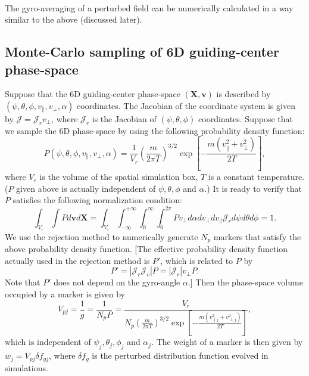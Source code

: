 \documentclass{article}
\begin{document}
\

The gyro-averaging of a perturbed field can be numerically calculated in a
way similar to the above (discussed later).

\subsection{Monte-Carlo sampling of 6D guiding-center phase-space
}\label{19-1-28-1}

Suppose that the 6D guiding-center phase-space $(\mathbf{X}, \mathbf{v})$ is
described by $(\psi, \theta, \phi, v_{\parallel}, v_{\perp}, \alpha)$
coordinates. The Jacobian of the coordinate system is given by $\mathcal{J} =
\mathcal{J}_r v_{\perp} \mathcal{}$, where $\mathcal{J}_r$ is the Jacobian of
$(\psi, \theta, \phi)$ coordinates. Suppose that we sample the 6D phase-space
by using the following probability density function:
\begin{equation}
  \label{19-1-26-1} P (\psi, \theta, \phi, v_{\parallel}, v_{\perp}, \alpha) =
  \frac{1}{V_r} \left( \frac{m}{2 \pi T} \right)^{3 / 2} \exp \left[ - \frac{m
  (v_{\parallel}^2 + v_{\perp}^2)}{2 T} \right],
\end{equation}
where $V_r$ is the volume of the spatial simulation box, $T$ is a constant
temperature. ($P$ given above is actually independent of $\psi, \theta, \phi$
and $\alpha$.) It is ready to verify that $P$ satisfies the following
normalization condition:
\begin{equation}
  \int_{V_r} \int P d\mathbf{v}d\mathbf{X}= \int_{V_r} \int_{- \infty}^{+
  \infty} \int_0^{\infty} \int_0^{2 \pi} P v_{\perp} d \alpha d v_{\perp} d
  v_{\parallel} \mathcal{J}_r d \psi d \theta d \phi = 1.
\end{equation}
We use the rejection method to numerically generate $N_p$ markers that satisfy
the above probability density function. [The effective probability density
function actually used in the rejection method is $P'$, which is related to
$P$ by
\begin{equation}
  P' = | \mathcal{J}_r \mathcal{J}_v | P = | \mathcal{J}_r | v_{\perp} P.
\end{equation}
Note that $P'$ does not depend on the gyro-angle $\alpha$.] Then the
phase-space volume occupied by a marker is given by
\begin{equation}
  V_{p j} = \frac{1}{g} = \frac{1}{N_p P} = \frac{V_r}{N_p \left( \frac{m}{2
  \pi T} \right)^{3 / 2} \exp \left[ - \frac{m (v_{\parallel j}^2 + v_{\perp
  j}^2)}{2 T} \right]},
\end{equation}
which is independent of $\psi_j, \theta_j, \phi_j$ and $\alpha_j$. The weight
of a marker is then given by $w_j = V_{p j} \delta f_{g j}$, where $\delta
f_g$ is the perturbed distribution function evolved in simulations.
\end{document}
